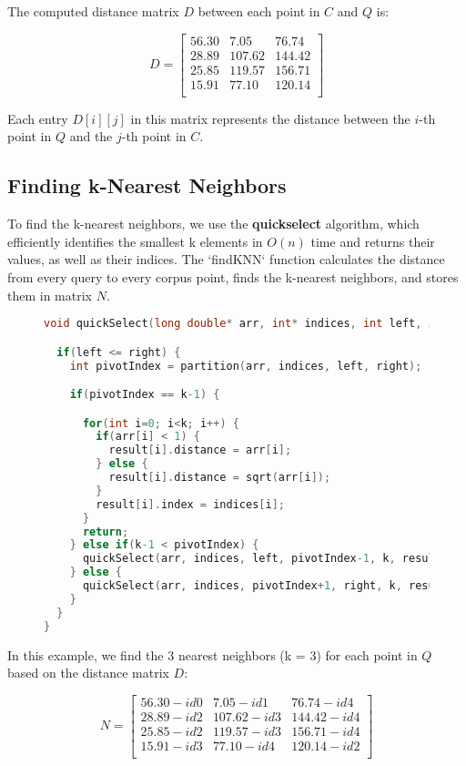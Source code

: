 \documentclass{article}
\begin{document}
The computed distance matrix \( D \) between each point in \( C \) and \( Q \) is:

\[
D = \begin{bmatrix}
56.30 & 7.05 & 76.74 \\
28.89 & 107.62 & 144.42 \\
25.85 & 119.57 & 156.71 \\
15.91 & 77.10 & 120.14 \\
\end{bmatrix}
\]

Each entry \( D[i][j] \) in this matrix represents the distance between the \( i \)-th point in \( Q \) and the \( j \)-th point in \( C \).

\subsection{Finding k-Nearest Neighbors}
To find the k-nearest neighbors, we use the \textbf{quickselect} algorithm, which efficiently identifies the smallest k elements in \( O(n) \) time and returns their values, as well as their indices. The `findKNN` function calculates the distance from every query to every corpus point, finds the k-nearest neighbors, and stores them in matrix \( N \).

\begin{figure}[H]
\begin{lstlisting}[language=C, caption={Quick Select algorithm implementation}]
void quickSelect(long double* arr, int* indices, int left, int right, int k, Neighbor* result) {

  if(left <= right) {
    int pivotIndex = partition(arr, indices, left, right);

    if(pivotIndex == k-1) {

      for(int i=0; i<k; i++) {
        if(arr[i] < 1) {
          result[i].distance = arr[i];
        } else {
          result[i].distance = sqrt(arr[i]);
        }
        result[i].index = indices[i];
      }
      return;
    } else if(k-1 < pivotIndex) {
      quickSelect(arr, indices, left, pivotIndex-1, k, result);
    } else {
      quickSelect(arr, indices, pivotIndex+1, right, k, result);
    }
  }
}
\end{lstlisting}
\end{figure}

In this example, we find the 3 nearest neighbors (k = 3) for each point in \( Q \) based on the distance matrix \( D \):

\[
N = \begin{bmatrix}
56.30 - id0 & 7.05 - id1 & 76.74 - id4 \\
28.89 - id2 & 107.62 - id3 & 144.42 - id4 \\
25.85 - id2 & 119.57 - id3 & 156.71 - id4 \\
15.91 - id3 & 77.10 - id4 & 120.14 - id2 \\
\end{bmatrix}
\]
\end{document}
